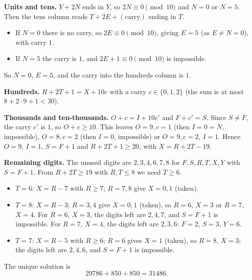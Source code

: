 \textbf{Units and tens.} $Y+2N$ ends in $Y$, so $2N\equiv0\pmod{10}$ and $N=0$ or $N=5$. Then the tens column reads $T+2E+(\text{carry})$ ending in $T$.
\begin{itemize}
\item If $N=0$ there is no carry, so $2E\equiv0\pmod{10}$, giving $E=5$ (as $E\ne N=0$), with carry $1$.
\item If $N=5$ the carry is $1$, and $2E+1\equiv0\pmod{10}$ is impossible.
\end{itemize}
So $N=0$, $E=5$, and the carry into the hundreds column is $1$.

\textbf{Hundreds.} $R+2T+1=X+10c$ with a carry $c\in\{0,1,2\}$ (the sum is at most $8+2\cdot9+1<30$).

\textbf{Thousands and ten-thousands.} $O+c=I+10c'$ and $F+c'=S$. Since $S\ne F$, the carry $c'$ is $1$, so $O+c\ge10$. This leaves $O=9,c=1$ (then $I=0=N$, impossible), $O=8,c=2$ (then $I=0$, impossible) or $O=9,c=2$, $I=1$. Hence $O=9$, $I=1$, $S=F+1$ and $R+2T+1\ge20$, with $X=R+2T-19$.

\textbf{Remaining digits.} The unused digits are $2,3,4,6,7,8$ for $F,S,R,T,X,Y$ with $S=F+1$. From $R+2T\ge19$ with $R,T\le8$ we need $T\ge6$.
\begin{itemize}
\item $T=6$: $X=R-7$ with $R\ge7$; $R=7,8$ give $X=0,1$ (taken).
\item $T=8$: $X=R-3$; $R=3,4$ give $X=0,1$ (taken), so $R=6$, $X=3$ or $R=7$, $X=4$. For $R=6$, $X=3$, the digits left are $2,4,7$, and $S=F+1$ is impossible. For $R=7$, $X=4$, the digits left are $2,3,6$: $F=2$, $S=3$, $Y=6$.
\item $T=7$: $X=R-5$ with $R\ge6$; $R=6$ gives $X=1$ (taken), so $R=8$, $X=3$; the digits left are $2,4,6$, and $S=F+1$ is impossible.
\end{itemize}
The unique solution is
\[
\boxed{29786+850+850=31486}.
\]
